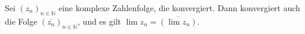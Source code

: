 Sei $(z_n)_{n \in \mathbb{N}}$ eine komplexe Zahlenfolge, die konvergiert. Dann konvergiert auch die Folge $(\overline{z_n})_{n \in \mathbb{N}}$, und es gilt $\lim z_n = \overline{(\lim z_n)}$.